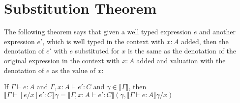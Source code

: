 \section{Substitution Theorem}
The following theorem says that given a well typed expression $e$ and another expression $e'$, which is well typed in the context with $x:A$ added, then the denotation of $e'$ with $e$ substituted for $x$ is the same as the denotation of the original expression in the context with $x:A$ added and valuation with the denotation of $e$ as the value of $x$:

\vspace{0.25cm}

\begin{thm}
If $\Gamma \vdash e : A$ and $\Gamma, x:A \vdash e' : C$ and $\gamma \in \llbracket \Gamma \rrbracket$, then $\llbracket \Gamma \vdash [e/x]e' : C \rrbracket \gamma =\llbracket \Gamma, x : A \vdash e': C \rrbracket (\gamma, \llbracket \Gamma \vdash e : A \rrbracket \gamma / x)$
\end{thm}

